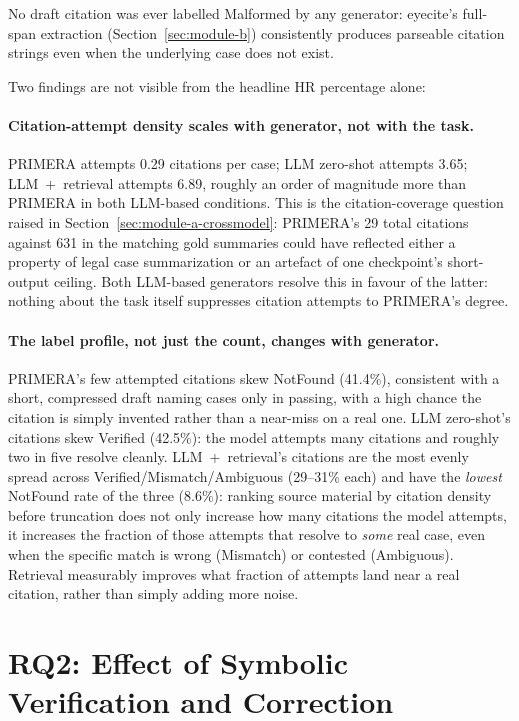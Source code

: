 No draft citation was ever labelled Malformed by any generator: eyecite's full-span extraction (Section~\ref{sec:module-b}) consistently produces parseable citation strings even when the underlying case does not exist.

Two findings are not visible from the headline HR percentage alone:

\paragraph{Citation-attempt density scales with generator, not with the task.} PRIMERA attempts 0.29 citations per case; LLM zero-shot attempts 3.65; LLM~+~retrieval attempts 6.89, roughly an order of magnitude more than PRIMERA in both LLM-based conditions. This is the citation-coverage question raised in Section~\ref{sec:module-a-crossmodel}: PRIMERA's 29 total citations against 631 in the matching gold summaries could have reflected either a property of legal case summarization or an artefact of one checkpoint's short-output ceiling. Both LLM-based generators resolve this in favour of the latter: nothing about the task itself suppresses citation attempts to PRIMERA's degree.

\paragraph{The label profile, not just the count, changes with generator.} PRIMERA's few attempted citations skew NotFound (41.4\%), consistent with a short, compressed draft naming cases only in passing, with a high chance the citation is simply invented rather than a near-miss on a real one. LLM zero-shot's citations skew Verified (42.5\%): the model attempts many citations and roughly two in five resolve cleanly. LLM~+~retrieval's citations are the most evenly spread across Verified/Mismatch/Ambiguous (29--31\% each) and have the \emph{lowest} NotFound rate of the three (8.6\%): ranking source material by citation density before truncation does not only increase how many citations the model attempts, it increases the fraction of those attempts that resolve to \emph{some} real case, even when the specific match is wrong (Mismatch) or contested (Ambiguous). Retrieval measurably improves what fraction of attempts land near a real citation, rather than simply adding more noise.

\section{RQ2: Effect of Symbolic Verification and Correction}
\label{sec:results-rq2}

